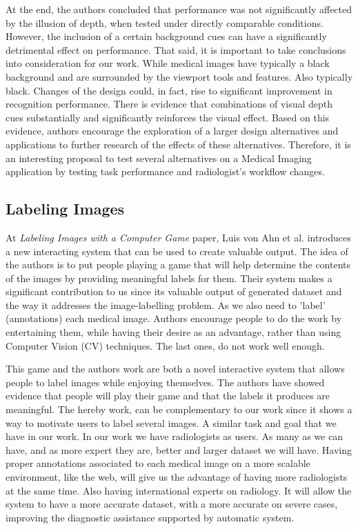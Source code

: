 \clearpage

At the end, the authors concluded that performance was not significantly affected by the illusion of depth, when tested under directly comparable conditions. However, the inclusion of a certain background cues can have a significantly detrimental effect on performance. That said, it is important to take conclusions into consideration for our work. While medical images have typically a black background and are surrounded by the viewport tools and features. Also typically black. Changes of the design could, in fact, rise to significant improvement in recognition performance. There is evidence that combinations of visual depth cues substantially and significantly reinforces the visual effect. Based on this evidence, authors encourage the exploration of a larger design alternatives and applications to further research of the effects of these alternatives. Therefore, it is an interesting proposal to test several alternatives on a Medical Imaging application by testing task performance and radiologist's workflow changes.

\subsection{Labeling Images}

At \textit{Labeling Images with a Computer Game} paper, Luis von Ahn et al. \cite{von2004labeling} introduces a new interacting system that can be used to create valuable output. The idea of the authors is to put people playing a game that will help determine the contents of the images by providing meaningful labels for them. Their system makes a significant contribution to us since its valuable output of generated dataset and the way it addresses the image-labelling problem. As we also need to 'label' (annotations) each medical image. Authors encourage people to do the work by entertaining them, while having their desire as an advantage, rather than using Computer Vision (CV) techniques. The last ones, do not work well enough.

This game and the authors work are both a novel interactive system that allows people to label images while enjoying themselves. The authors have showed evidence that people will play their game and that the labels it produces are meaningful. The hereby work, can be complementary to our work since it shows a way to motivate users to label several images. A similar task and goal that we have in our work. In our work we have radiologists as users. As many as we can have, and as more expert they are, better and larger dataset we will have. Having proper annotations associated to each medical image on a more scalable environment, like the web, will give us the advantage of having more radiologists at the same time. Also having international experts on radiology. It will allow the system to have a more accurate dataset, with a more accurate on severe cases, improving the diagnostic assistance supported by automatic system.













